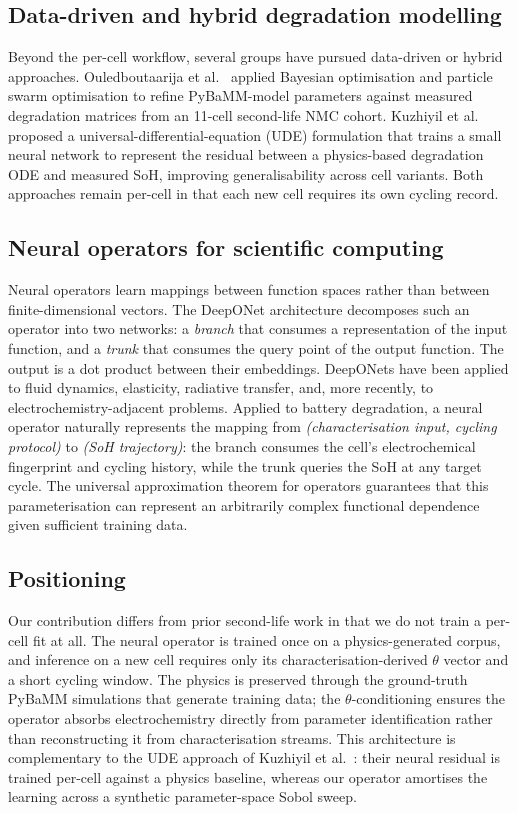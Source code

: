 \documentclass[preprint,12pt,3p,authoryear]{elsarticle}
\begin{document}
\subsection{Data-driven and hybrid degradation modelling}
Beyond the per-cell workflow, several groups have pursued data-driven
or hybrid approaches. Ouledboutaarija et al.\
\citep{ouledboutaarija2025} applied Bayesian optimisation and particle
swarm optimisation to refine PyBaMM-model parameters against measured
degradation matrices from an \num{11}-cell second-life NMC cohort.
Kuzhiyil et al.\ \citep{kuzhiyil2025generalisability} proposed a
universal-differential-equation (UDE) formulation that trains a small
neural network to represent the residual between a physics-based
degradation ODE and measured SoH, improving generalisability across
cell variants. Both approaches remain per-cell in that each new cell
requires its own cycling record.

\subsection{Neural operators for scientific computing}
Neural operators \citep{lu2021learning, li2020neural, kovachki2023neural}
learn mappings between function spaces rather than between finite-dimensional
vectors. The DeepONet architecture \citep{lu2021learning} decomposes such
an operator into two networks: a \emph{branch} that consumes a
representation of the input function, and a \emph{trunk} that consumes the
query point of the output function. The output is a dot product between
their embeddings. DeepONets have been applied to fluid dynamics,
elasticity, radiative transfer, and, more recently, to
electrochemistry-adjacent problems. Applied to battery degradation, a
neural operator naturally represents the mapping from
\emph{(characterisation input, cycling protocol)} to \emph{(SoH
trajectory)}: the branch consumes the cell's electrochemical fingerprint
and cycling history, while the trunk queries the SoH at any target
cycle. The universal approximation theorem for operators
\citep{chen1995universal} guarantees that this parameterisation can
represent an arbitrarily complex functional dependence given sufficient
training data.

\subsection{Positioning}
Our contribution differs from prior second-life work in that we do not
train a per-cell fit at all. The neural operator is trained once on a
physics-generated corpus, and inference on a new cell requires only its
characterisation-derived \(\theta\) vector and a short cycling window.
The physics is preserved through the ground-truth PyBaMM simulations
that generate training data; the \(\theta\)-conditioning ensures the
operator absorbs electrochemistry directly from parameter identification
rather than reconstructing it from characterisation streams. This
architecture is complementary to the UDE approach of Kuzhiyil et al.\
\citep{kuzhiyil2025generalisability}: their neural residual is trained
per-cell against a physics baseline, whereas our operator amortises the
learning across a synthetic parameter-space Sobol sweep.
\end{document}
